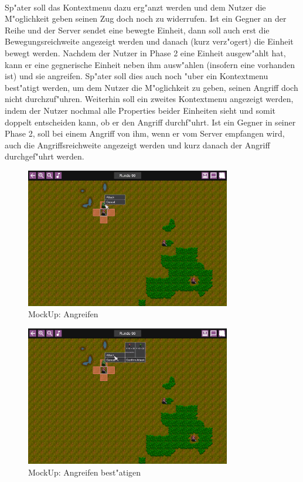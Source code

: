 \documentclass[12pt, titlepage]{scrartcl}
\newcounter{subsubsubsection}[subsubsection]
\begin{document}
                    \ \\ Sp"ater soll das Kontextmenu dazu erg"anzt werden und dem Nutzer die M"oglichkeit geben seinen Zug doch noch zu widerrufen. Ist ein Gegner an der Reihe und der Server sendet eine bewegte Einheit, dann soll auch erst die Bewegungsreichweite angezeigt werden und danach (kurz verz"ogert) die Einheit bewegt werden.
			        Nachdem der Nutzer in Phase 2 eine Einheit ausgew"ahlt hat, kann er eine gegnerische Einheit neben ihm ausw"ahlen (insofern eine vorhanden ist) und sie angreifen. Sp"ater soll dies auch noch "uber ein Kontextmenu best"atigt werden, um dem Nutzer die M"oglichkeit zu geben, seinen Angriff doch nicht durchzuf"uhren. Weiterhin soll ein zweites Kontextmenu angezeigt werden, indem der Nutzer nochmal alle Properties beider Einheiten sieht und somit doppelt entscheiden kann, ob er den Angriff durchf"uhrt. Ist ein Gegner in seiner Phase 2, soll bei einem Angriff von ihm, wenn er vom Server empfangen wird, auch die Angriffsreichweite angezeigt werden und kurz danach der Angriff durchgef"uhrt werden.
			        \begin{figure}[H] 
    				    \centering
    				    \includegraphics[width=0.8\textwidth]{images/mockUps/Attack.png}
    				    \caption{MockUp: Angreifen}
    				    \label{Attack}
			        \end{figure}
			        \begin{figure}[H] 
    				    \centering
    				    \includegraphics[width=0.8\textwidth]{images/mockUps/ConfirmAttack.png}
    				    \caption{MockUp: Angreifen best"atigen}
    				    \label{Attack_Confirm}
			        \end{figure}
\end{document}
